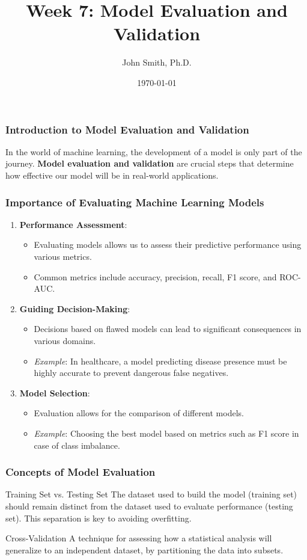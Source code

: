 \documentclass[aspectratio=169]{beamer}
\title[Model Evaluation and Validation]{Week 7: Model Evaluation and Validation}
\author[J. Smith]{John Smith, Ph.D.}
\institute[University Name]{
  Department of Computer Science\\
  University Name\\
  \vspace{0.3cm}
  Email: email@university.edu\\
  Website: www.university.edu
}
\date{\today}
\begin{document}
\frame{\titlepage}

\begin{frame}[fragile]
    \frametitle{Introduction to Model Evaluation and Validation}
    In the world of machine learning, the development of a model is only part of the journey. \textbf{Model evaluation and validation} are crucial steps that determine how effective our model will be in real-world applications. 
\end{frame}

\begin{frame}[fragile]
    \frametitle{Importance of Evaluating Machine Learning Models}
    \begin{enumerate}
        \item \textbf{Performance Assessment}: 
        \begin{itemize}
            \item Evaluating models allows us to assess their predictive performance using various metrics.
            \item Common metrics include accuracy, precision, recall, F1 score, and ROC-AUC.
        \end{itemize}

        \item \textbf{Guiding Decision-Making}:
        \begin{itemize}
            \item Decisions based on flawed models can lead to significant consequences in various domains.
            \item \textit{Example}: In healthcare, a model predicting disease presence must be highly accurate to prevent dangerous false negatives.
        \end{itemize}

        \item \textbf{Model Selection}:
        \begin{itemize}
            \item Evaluation allows for the comparison of different models.
            \item \textit{Example}: Choosing the best model based on metrics such as F1 score in case of class imbalance.
        \end{itemize}
    \end{enumerate}
\end{frame}

\begin{frame}[fragile]
    \frametitle{Concepts of Model Evaluation}
    \begin{block}{Training Set vs. Testing Set}
        The dataset used to build the model (training set) should remain distinct from the dataset used to evaluate performance (testing set). This separation is key to avoiding overfitting.
    \end{block}

    \begin{block}{Cross-Validation}
        A technique for assessing how a statistical analysis will generalize to an independent dataset, by partitioning the data into subsets.
    \end{block}
\end{frame}
\end{document}
